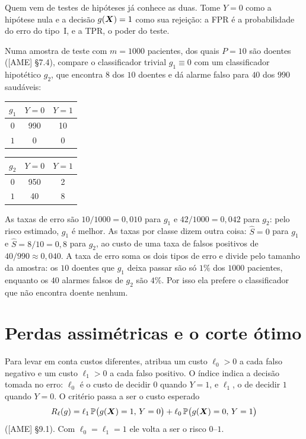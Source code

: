 \documentclass[11pt,a4paper]{article}
\begin{document}
\begin{observacao}
Quem vem de testes de hipóteses já conhece as duas. Tome $Y=0$ como a hipótese nula
e a decisão $g(\bm{X})=1$ como sua rejeição: a FPR é a probabilidade do erro do tipo~I, e
a TPR, o poder do teste.
\end{observacao}

\begin{exemplo}
Numa amostra de teste com $m=1000$ pacientes, dos quais $P=10$ são doentes ([AME]
§7.4), compare o classificador trivial $g_1\equiv0$ com um classificador hipotético
$g_2$, que encontra $8$ dos $10$ doentes e dá alarme falso para $40$ dos $990$
saudáveis:
\begin{center}\small
\begin{tabular}{c|cc}
  $g_1$ & $Y=0$ & $Y=1$ \\ \hline
  $0$ & 990 & 10 \\
  $1$ & 0 & 0
\end{tabular}
\qquad\qquad
\begin{tabular}{c|cc}
  $g_2$ & $Y=0$ & $Y=1$ \\ \hline
  $0$ & 950 & 2 \\
  $1$ & 40 & 8
\end{tabular}
\end{center}
As taxas de erro são $10/1000=0{,}010$ para $g_1$ e $42/1000=0{,}042$ para $g_2$:
pelo risco estimado, $g_1$ é melhor. As taxas por classe dizem outra coisa:
$\widehat S=0$ para $g_1$ e $\widehat S=8/10=0{,}8$ para $g_2$, ao custo de uma taxa de
falsos positivos de $40/990\approx0{,}040$. A taxa de erro soma os dois tipos de erro
e divide pelo tamanho da amostra: os $10$ doentes que $g_1$ deixa passar são só $1\%$
dos $1000$ pacientes, enquanto os $40$ alarmes falsos de $g_2$ são $4\%$. Por isso ela
prefere o classificador que não encontra doente nenhum.
\end{exemplo}

\section{Perdas assimétricas e o corte ótimo}\label{sec:custos}
Para levar em conta custos diferentes, atribua um custo $\ell_0>0$ a cada falso
negativo e um custo $\ell_1>0$ a cada falso positivo. O índice indica a decisão
tomada no erro: $\ell_0$ é o custo de decidir $0$ quando $Y=1$, e $\ell_1$, o de
decidir $1$ quando $Y=0$. O critério passa a ser o custo esperado
\begin{equation}\label{eq:riscoassim}
  R_\ell(g)=\ell_1\,\mathbb{P}\big(g(\bm{X})=1,\,Y=0\big)
                +\ell_0\,\mathbb{P}\big(g(\bm{X})=0,\,Y=1\big)
\end{equation}
([AME] §9.1). Com $\ell_0=\ell_1=1$ ele volta a ser o risco $0$--$1$.
\end{document}
